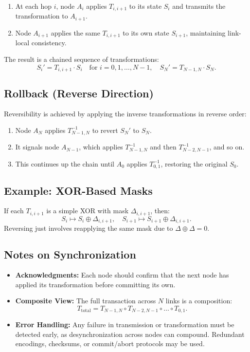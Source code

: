 \begin{enumerate}
\item At each hop \(i\), node \(A_i\) applies \(T_{i,i+1}\) to its state \(S_i\) and transmits the transformation to \(A_{i+1}\).
\item Node \(A_{i+1}\) applies the same \(T_{i,i+1}\) to its own state \(S_{i+1}\), maintaining link-local consistency.
\end{enumerate}

The result is a chained sequence of transformations:
\[
  S_i' = T_{i,i+1} \cdot S_i \quad \text{for } i = 0, 1, \dots, N-1,
\quad
S_N' = T_{N-1,N} \cdot S_N.
\]

\subsection{Rollback (Reverse Direction)}

Reversibility is achieved by applying the inverse transformations in reverse order:

\begin{enumerate}
\item Node \(A_N\) applies \(T_{N-1,N}^{-1}\) to revert \(S_N'\) to \(S_N\).
\item It signals node \(A_{N-1}\), which applies \(T_{N-1,N}^{-1}\) and then \(T_{N-2,N-1}^{-1}\), and so on.
\item This continues up the chain until \(A_0\) applies \(T_{0,1}^{-1}\), restoring the original \(S_0\).
\end{enumerate}

\subsection{Example: XOR-Based Masks}

If each \(T_{i,i+1}\) is a simple XOR with mask \(\Delta_{i,i+1}\), then:
\[
  S_i \mapsto S_i \oplus \Delta_{i,i+1}, \quad
  S_{i+1} \mapsto S_{i+1} \oplus \Delta_{i,i+1}.
\]
Reversing just involves reapplying the same mask due to \(\Delta \oplus \Delta = 0\).

\subsection{Notes on Synchronization}

\begin{itemize}
\item \textbf{Acknowledgments:} Each node should confirm that the next node has applied its transformation before committing its own.
\item \textbf{Composite View:} The full transaction across \(N\) links is a composition:
\[
  T_{\text{total}} = T_{N-1,N} \circ T_{N-2,N-1} \circ \dots \circ T_{0,1}.
\]
\item \textbf{Error Handling:} Any failure in transmission or transformation must be detected early, as desynchronization across nodes can compound. Redundant encodings, checksums, or commit/abort protocols may be used.
\end{itemize}


